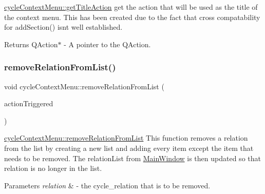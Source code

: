 \mbox{\hyperlink{classcycle_context_menu_a0e955d1a633d3585d11b7c193341a568}{cycle\+Context\+Menu\+::get\+Title\+Action}} get the action that will be used as the title of the context menu. This has been created due to the fact that cross compatability for \textquotesingle{}add\+Section()\textquotesingle{} isn\textquotesingle{}t well established. 

\begin{DoxyReturn}{Returns}
Q\+Action$\ast$ -\/ A pointer to the Q\+Action. 
\end{DoxyReturn}
\mbox{\label{classcycle_context_menu_a83f3eb1ea5338154095a7bf1e2c77b01}} 
\subsubsection{\texorpdfstring{remove\+Relation\+From\+List()}{removeRelationFromList()}}
{\footnotesize\ttfamily void cycle\+Context\+Menu\+::remove\+Relation\+From\+List (\begin{DoxyParamCaption}\item[{\mbox{\hyperlink{classmenu_rel_action}{menu\+Rel\+Action}} $\ast$}]{action\+Triggered }\end{DoxyParamCaption})}



\mbox{\hyperlink{classcycle_context_menu_a83f3eb1ea5338154095a7bf1e2c77b01}{cycle\+Context\+Menu\+::remove\+Relation\+From\+List}} This function removes a relation from the list by creating a new list and adding every item except the item that needs to be removed. The \textquotesingle{}relation\+List\textquotesingle{} from \mbox{\hyperlink{class_main_window}{Main\+Window}} is then updated so that \textquotesingle{}relation\textquotesingle{} is no longer in the list. 


\begin{DoxyParams}{Parameters}
{\em relation} & -\/ the cycle\+\_\+relation that is to be removed. \\
\hline
\end{DoxyParams}
\mbox{\label{classcycle_context_menu_adf29caf51604118b6ced6a02c5172252}} 
